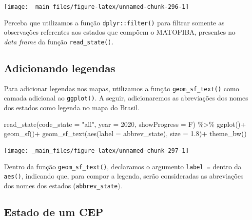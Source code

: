 \documentclass[
  brazilian,
]{book}
\newenvironment{Shaded}{\begin{snugshade}}{\end{snugshade}}
\newcommand{\AttributeTok}[1]{\textcolor[rgb]{0.77,0.63,0.00}{#1}}
\newcommand{\DecValTok}[1]{\textcolor[rgb]{0.00,0.00,0.81}{#1}}
\newcommand{\FloatTok}[1]{\textcolor[rgb]{0.00,0.00,0.81}{#1}}
\newcommand{\FunctionTok}[1]{\textcolor[rgb]{0.00,0.00,0.00}{#1}}
\newcommand{\NormalTok}[1]{#1}
\newcommand{\SpecialCharTok}[1]{\textcolor[rgb]{0.00,0.00,0.00}{#1}}
\newcommand{\StringTok}[1]{\textcolor[rgb]{0.31,0.60,0.02}{#1}}
\begin{document}
\begin{center}\texttt{[image: \_main\_files/figure-latex/unnamed-chunk-296-1]} \end{center}

Perceba que utilizamos a função \texttt{dplyr::filter()} para filtrar somente as observações referentes aos estados que compõem o MATOPIBA, presentes no \emph{data frame} da função \texttt{read\_state()}.

\hypertarget{leg}{%
\subsection{Adicionando legendas}\label{leg}}

Para adicionar legendas nos mapas, utilizamos a função \texttt{geom\_sf\_text()} como camada adicional ao \texttt{ggplot()}. A seguir, adicionaremos as abreviações dos nomes dos estados como legenda no mapa do Brasil.

\begin{Shaded}
\begin{Highlighting}[]
\FunctionTok{read\_state}\NormalTok{(}\AttributeTok{code\_state =} \StringTok{"all"}\NormalTok{,}
           \AttributeTok{year =} \DecValTok{2020}\NormalTok{,}
           \AttributeTok{showProgress =}\NormalTok{ F) }\SpecialCharTok{\%\textgreater{}\%} 
  \FunctionTok{ggplot}\NormalTok{()}\SpecialCharTok{+}
  \FunctionTok{geom\_sf}\NormalTok{()}\SpecialCharTok{+}
  \FunctionTok{geom\_sf\_text}\NormalTok{(}\FunctionTok{aes}\NormalTok{(}\AttributeTok{label =}\NormalTok{ abbrev\_state), }\AttributeTok{size =} \FloatTok{1.8}\NormalTok{)}\SpecialCharTok{+}
  \FunctionTok{theme\_bw}\NormalTok{()}
\end{Highlighting}
\end{Shaded}

\begin{center}\texttt{[image: \_main\_files/figure-latex/unnamed-chunk-297-1]} \end{center}

Dentro da função \texttt{geom\_sf\_text()}, declaramos o argumento \texttt{label\ =} dentro da \texttt{aes()}, indicando que, para compor a legenda, serão consideradas as abreviações dos nomes dos estados (\texttt{abbrev\_state}).

\hypertarget{estado-de-um-cep}{%
\subsection{Estado de um CEP}\label{estado-de-um-cep}}
\end{document}
